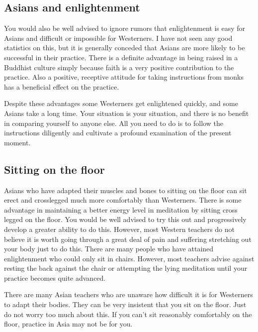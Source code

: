 \documentclass[a5paper,10pt,english]{book}
\begin{document}
\subsection{Asians and enlightenment}
\label{\detokenize{saints:asians-and-enlightenment}}
\sphinxAtStartPar
You would also be well advised to ignore rumors that enlightenment is
easy for Asians and difficult or impossible for Westerners. I have not
seen any good statistics on this, but it is generally conceded that
Asians are more likely to be successful in their practice. There is a
definite advantage in being raised in a Buddhist culture simply because
faith is a very positive contribution to the practice. Also a positive,
receptive attitude for taking instructions from monks has a beneficial
effect on the practice.

\sphinxAtStartPar
Despite these advantages some Westerners get enlightened quickly, and
some Asians take a long time. Your situation is your situation, and
there is no benefit in comparing yourself to anyone else. All you need
to do is to follow the instructions diligently and cultivate a profound
examination of the present moment.


\subsection{Sitting on the floor}
\label{\detokenize{saints:sitting-on-the-floor}}
\sphinxAtStartPar
Asians who have adapted their muscles and bones to sitting on the floor
can sit erect and cross\sphinxhyphen{}legged much more comfortably than Westerners.
There is some advantage in maintaining a better energy level in
meditation by sitting cross legged on the floor. You would be well
advised to try this out and progressively develop a greater ability to
do this. However, most Western teachers do not believe it is worth going
through a great deal of pain and suffering stretching out your body just
to do this. There are many people who have attained enlightenment who
could only sit in chairs. However, most teachers advise against resting
the back against the chair or attempting the lying meditation until your
practice becomes quite advanced.

\sphinxAtStartPar
There are many Asian teachers who are unaware how difficult it is for
Westerners to adapt their bodies. They can be very insistent that you
sit on the floor. Just do not worry too much about this. If you can’t
sit reasonably comfortably on the floor, practice in Asia may not be for
you.
\end{document}
